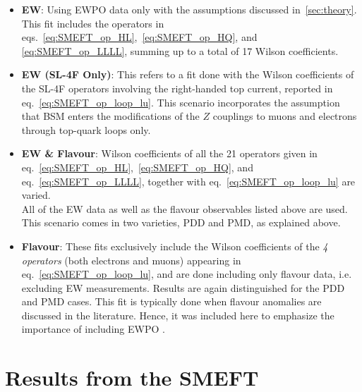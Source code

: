 \begin{itemize}
	\setlength\itemsep{0em}
	\item {\bf EW}: 
	Using EWPO data only with the assumptions discussed in~\autoref{sec:theory}. This fit includes the operators in eqs.~\eqref{eq:SMEFT_op_HL},~\eqref{eq:SMEFT_op_HQ}, and \eqref{eq:SMEFT_op_LLLL}, summing up to a total of 17 Wilson coefficients.
	\item  {\bf EW (SL-4F Only)}: This refers to a fit done with the Wilson coefficients of the { SL-4F operators} involving the right-handed top current, reported in eq.~\eqref{eq:SMEFT_op_loop_lu}. This scenario incorporates the assumption that BSM enters the modifications of the $Z$ couplings to muons and electrons through top-quark loops only.
	\item {\bf EW \& Flavour}: Wilson coefficients of all the { 21 operators} given in eq.~\eqref{eq:SMEFT_op_HL},~\eqref{eq:SMEFT_op_HQ}, and eq.~\eqref{eq:SMEFT_op_LLLL}, together with eq.~\eqref{eq:SMEFT_op_loop_lu} are varied.\\
   All of the EW data  as well as the flavour observables listed above are used. This scenario comes in two varieties, PDD and PMD, as explained above.
	\item {\bf Flavour}: These fits exclusively include the Wilson coefficients of the {\em 4 operators} (both electrons and muons) appearing in eq.~\eqref{eq:SMEFT_op_loop_lu}, and are done including only flavour data, i.e. excluding EW measurements. Results are again distinguished for the PDD and PMD cases. This fit is typically done when flavour anomalies are discussed in the literature. Hence, it was included here to emphasize the importance of including EWPO .
\end{itemize}


\section{Results from the SMEFT}
\label{sec:EFT_results}

